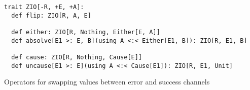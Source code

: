 \begin{algorithm}

\begin{verbatim}
trait ZIO[-R, +E, +A]:
  def flip: ZIO[R, A, E]

  def either: ZIO[R, Nothing, Either[E, A]]
  def absolve[E1 >: E, B](using A <:< Either[E1, B]): ZIO[R, E1, B]

  def cause: ZIO[R, Nothing, Cause[E]]
  def uncause[E1 >: E](using A <:< Cause[E1]): ZIO[R, E1, Unit]
\end{verbatim}

\caption{Operators for swapping values between error and success channels \label{zio:error-tricks}}
\end{algorithm}